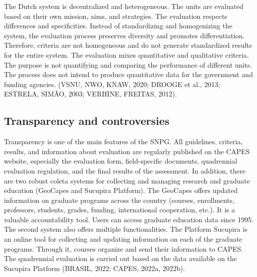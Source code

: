 The Dutch system is decentralized and heterogeneous. The units are evaluated based on their own mission, aims, and strategies. The evaluation respects differences and specificities. Instead of standardizing and homogenizing the system, the evaluation process preserves diversity and promotes differentiation. Therefore, criteria are not homogeneous and do not generate standardized results for the entire system. The evaluation mixes quantitative and qualitative criteria. The purpose is not quantifying and comparing the performance of different units. The process does not intend to produce quantitative data for the government and funding agencies.          (VSNU, NWO, KNAW, 2020; DROOGE et al., 2013; ESTRELA, SIMÃO, 2003; VERHINE, FREITAS, 2012).   


\subsection{Transparency and controversies}
\label{subsec:comp_evaluation:transparency}





Transparency is one of the main features of the SNPG. All guidelines, criteria, results, and information about evaluation are regularly published on the CAPES website, especially the evaluation form, field-specific documents, quadrennial evaluation regulation, and the final results of the assessment. In addition, there are two robust coleta systems for collecting and managing research and graduate education (GeoCapes and Sucupira Platform). The GeoCapes offers updated information on graduate programs across the country (courses, enrollments, professors, students, grades, funding, international cooperation, etc.). It is a valuable accountability tool. Users can access graduate education data since 1995. The second system also offers multiple functionalities. The Platform Sucupira is an online tool for collecting and updating information on each of the graduate programs. Through it, courses organize and send their information to CAPES. The quadrennial evaluation is carried out based on the data available on the Sucupira 
Platform (BRASIL, 2022; CAPES, 2022a, 2022b).         

